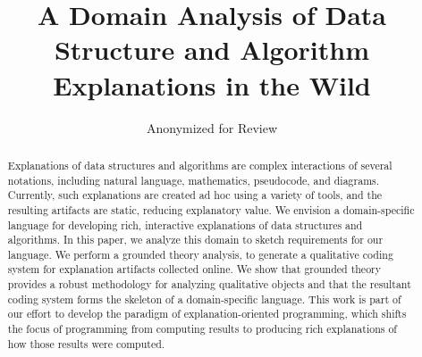 \documentclass[sigconf]{acmart}
\begin{document}
\title{A Domain Analysis of Data Structure and Algorithm Explanations in the Wild}


\author{Anonymized for Review}


\begin{abstract}
  Explanations of data structures and algorithms are complex interactions of
  several notations, including natural language, mathematics, pseudocode, and
  diagrams. Currently, such explanations are created ad hoc using a variety of
  tools, and the resulting artifacts are static, reducing explanatory value. We
  envision a domain-specific language for developing rich, interactive
  explanations of data structures and algorithms. In this paper, we analyze this
  domain to sketch requirements for our language. We perform a grounded theory
  analysis, to generate a qualitative coding system for explanation artifacts
  collected online. We show that grounded theory provides a robust methodology
  for analyzing qualitative objects and that the resultant coding system forms
  the skeleton of a domain-specific language. This work is part of our effort to
  develop the paradigm of explanation-oriented programming, which shifts the
  focus of programming from computing results to producing rich explanations of
  how those results were computed.
\end{abstract}

%
%




\maketitle
\end{document}
